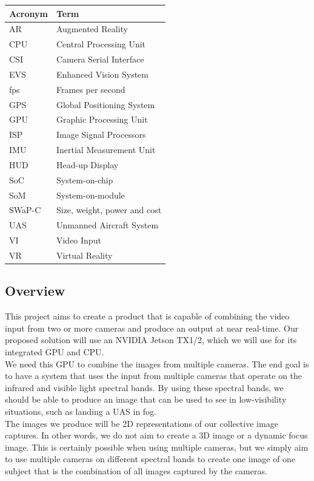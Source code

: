 \documentclass[letterpaper,10pt,serif,draftclsnofoot,onecolumn,compsoc,titlepage]{IEEEtran}
\begin{document}
\begin{tabular}{|l|l|}
	\hline
	\textbf{Acronym} & \textbf{Term}\\
	\hline
	AR & Augmented Reality\\
	\hline
	CPU & Central Processing Unit\\
	\hline
	CSI & Camera Serial Interface\\
	\hline
	EVS & Enhanced Vision System\\
	\hline
	fps & Frames per second\\
	\hline
	GPS & Global Positioning System\\
	\hline
	GPU & Graphic Processing Unit\\
	\hline
	ISP & Image Signal Processors\\
	\hline
	IMU & Inertial Measurement Unit\\
	\hline
	HUD & Head-up Display\\
	\hline
	SoC & System-on-chip\\
	\hline
	SoM & System-on-module\\
	\hline
	SWaP-C & Size, weight, power and cost\\
	\hline
	UAS & Unmanned Aircraft System\\
	\hline
	VI & Video Input\\
	\hline
	VR & Virtual Reality\\
	\hline
\end{tabular}

\subsection{Overview}

This project aims to create a product that is capable of combining the video input from 
two or more cameras and produce an output at near real-time. Our proposed solution 
will use an NVIDIA Jetson TX1/2, which we will use for its integrated GPU and CPU.\\

We need this GPU to combine the images from multiple cameras. The end goal is to have 
a system that uses the input from multiple cameras that operate on the infrared and 
visible light spectral bands. By using these spectral bands, we should be able to 
produce an image that can be used to see in low-visibility situations, such as landing 
a UAS in fog.\\

The images we produce will be 2D representations of our collective image captures. In 
other words, we do not aim to create a 3D image or a dynamic focus image. This is 
certainly possible when using multiple cameras, but we simply aim to use multiple 
cameras on different spectral bands to create one image of one subject that is the 
combination of all images captured by the cameras.\\
\end{document}
